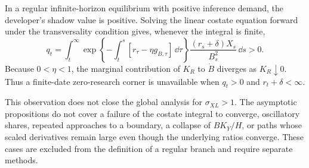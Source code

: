 In a regular infinite-horizon equilibrium with positive inference demand, the developer's shadow value is positive. Solving the linear costate equation forward under the transversality condition gives, whenever the integral is finite,
\[
 q_t=\int_t^\infty
 \exp\left\{-\int_t^s
 [r_\tau-\eta g_{B,\tau}]\,\dd\tau\right\}
 \frac{(r_s+\delta)X_s}{B_s^2}\,\dd s>0.
\]
Because $0<\eta<1$, the marginal contribution of $K_R$ to
$\dot B$ diverges as $K_R\downarrow0$. Thus a finite-date zero-research corner is unavailable when $q_t>0$ and $r_t+\delta<\infty$.

This observation does not close the global analysis for $\sigma_{XL}>1$. The asymptotic propositions do not cover a failure of the costate integral to converge, oscillatory shares, repeated approaches to a boundary, a collapse of $BK_Y/H$, or paths whose scaled derivatives remain large even though the underlying ratios converge. These cases are excluded from the definition of a regular branch and require separate methods.
